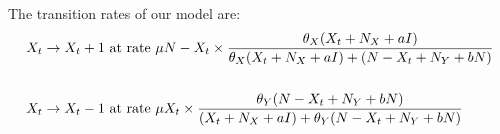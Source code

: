 \documentclass[10pt,a4paper]{article}
\begin{document}
	The transition rates of our model are:
	\begin{align*}
	X_t \rightarrow X_t + 1 & \textnormal{ at rate } \mu N-X_t\times \frac{\theta_X (X_t + N_X + aI)}{\theta_X (X_t + N_X + aI) + (N-X_t + N_Y + bN)} \\
	&\\
	X_t \rightarrow X_t - 1 & \textnormal{ at rate } \mu X_t\times \frac{\theta_Y(N-X_t + N_Y + bN)}{(X_t + N_X + aI) + \theta_Y(N-X_t + N_Y + bN)}
	\end{align*}
	
\end{document}
